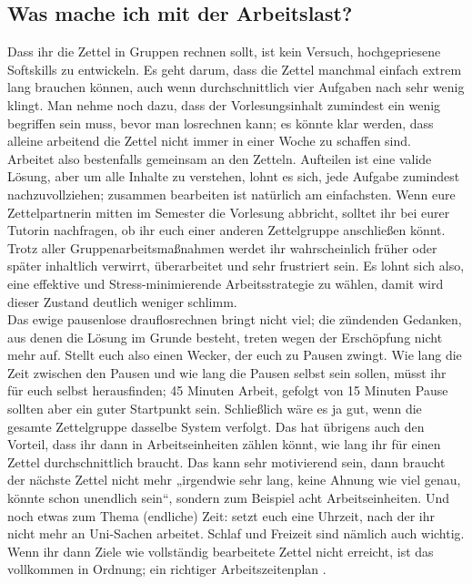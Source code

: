 \subsection{Was mache ich mit der Arbeitslast?}
Dass ihr die Zettel in Gruppen rechnen sollt, ist kein Versuch, hochgepriesene Softskills zu entwickeln. Es geht darum, dass die Zettel manchmal einfach extrem lang brauchen können, auch wenn durchschnittlich vier Aufgaben nach sehr wenig klingt. Man nehme noch dazu, dass der Vorlesungsinhalt zumindest ein wenig begriffen sein muss, bevor man losrechnen kann; es könnte klar werden, dass alleine arbeitend die Zettel nicht immer in einer Woche zu schaffen sind. \\
Arbeitet also bestenfalls gemeinsam an den Zetteln. Aufteilen ist eine valide Lösung, aber um alle Inhalte zu verstehen, lohnt es sich, jede Aufgabe zumindest nachzuvollziehen; zusammen bearbeiten ist natürlich am einfachsten.
Wenn eure Zettelpartnerin mitten im Semester die Vorlesung abbricht, solltet ihr bei eurer Tutorin nachfragen, ob ihr euch einer anderen Zettelgruppe anschließen könnt. \\
Trotz aller Gruppenarbeitsmaßnahmen werdet ihr wahrscheinlich früher oder später inhaltlich verwirrt, überarbeitet und sehr frustriert sein. Es lohnt sich also, eine effektive und Stress-minimierende Arbeitsstrategie zu wählen, damit wird dieser Zustand deutlich weniger schlimm. \\
Das ewige pausenlose drauflosrechnen bringt nicht viel; die zündenden Gedanken, aus denen die Lösung im Grunde besteht, treten wegen der Erschöpfung nicht mehr auf. Stellt euch also einen Wecker, der euch zu Pausen zwingt. Wie lang die Zeit zwischen den Pausen und wie lang die Pausen selbst sein sollen, müsst ihr für euch selbst herausfinden; 45 Minuten Arbeit, gefolgt von 15 Minuten Pause sollten aber ein guter Startpunkt sein. Schließlich wäre es ja gut, wenn die gesamte Zettelgruppe dasselbe System verfolgt. Das hat übrigens auch den Vorteil, dass ihr dann in Arbeitseinheiten zählen könnt, wie lang ihr für einen Zettel durchschnittlich braucht. Das kann sehr motivierend sein, dann braucht der nächste Zettel nicht mehr „irgendwie sehr lang, keine Ahnung wie viel genau, könnte schon unendlich sein“, sondern zum Beispiel acht Arbeitseinheiten.
Und noch etwas zum Thema (endliche) Zeit: setzt euch eine Uhrzeit, nach der ihr nicht mehr an Uni-Sachen arbeitet. Schlaf und Freizeit sind nämlich auch wichtig. Wenn ihr dann Ziele wie vollständig bearbeitete Zettel nicht erreicht, ist das vollkommen in Ordnung; ein richtiger Arbeitszeitenplan . \\
